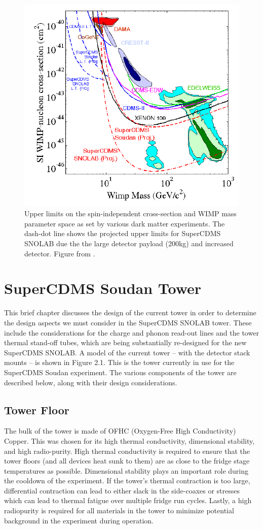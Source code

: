 \documentclass{report}
\begin{document}
\begin{figure}[h]
\centering
\includegraphics[width = .5\textwidth]{crosssection.png}
\caption{Upper limits on the spin-independent cross-section and WIMP mass parameter space as set by various dark matter experiments. The dash-dot line shows the projected upper limits for SuperCDMS SNOLAB due the the large detector payload (200kg) and increased detector. Figure from \cite{DOE}.}
\end{figure}

\chapter{SuperCDMS Soudan Tower}

This brief chapter discusses the design of the current tower in order to determine the design aspects we must consider in the SuperCDMS SNOLAB tower. These include the considerations for the charge and phonon read-out lines and the tower thermal stand-off tubes, which are being substantially re-designed for the new SuperCDMS SNOLAB. A model of the current tower -- with the detector stack mounts -- is shown in Figure 2.1. This is the tower currently in use for the SuperCDMS Soudan experiment. The various components of the tower are described below, along with their design considerations.

\section{Tower Floor}
The bulk of the tower is made of OFHC (Oxygen-Free High Conductivity) Copper. This was chosen for its high thermal conductivity, dimensional stability, and high radio-purity. High thermal conductivity is required to ensure that the tower floors (and all devices heat sunk to them) are as close to the fridge stage temperatures as possible. Dimensional stability plays an important role during the cooldown of the experiment. If the tower's thermal contraction is too large, differential contraction can lead to either slack in the side-coaxes or stresses which can lead to thermal fatigue over multiple fridge run cycles. Lastly, a high radiopurity is required for all materials in the tower to minimize potential background in the experiment during operation.
\end{document}
